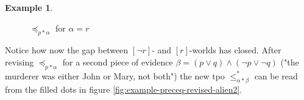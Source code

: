 \documentclass[english, 12pt]{scrartcl}
\theoremstyle{definition}
\newtheorem{example}{Example}[section]
\theoremstyle{definition}
\theoremstyle{definition}
\begin{document}
\begin{example}
\begin{figure}[h]
            \caption{$\preceq_{p \ast \alpha}$ for $\alpha = r$}
            \label{fig:example-preceq-revised-alien}
    \end{figure}
    
    Notice how now the gap between $[\neg r]$- and $[r]$-worlds has closed. After revising $\preceq_{p \ast \alpha}$ for a second piece of evidence $\beta = (p \vee q) \wedge (\neg p \vee \neg q)$ ("the murderer was either John or Mary, not both") the new tpo $\leq_{\alpha \ast \beta}^{\ast}$ can be read from the filled dots in figure \ref{fig:example-preceq-revised-alien2}.
    

\end{example}
\end{document}
